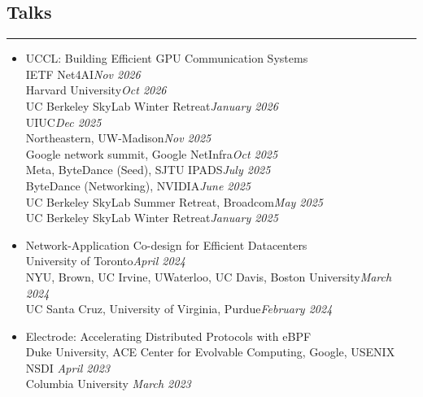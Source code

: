 \documentclass[letterpaper, 11pt]{article}
\newcommand\toRight{\hspace*{0pt}\hfill}
\newcounter{mySaveCounter}
\newcommand\myEnumReset{\setcounter{mySaveCounter}{0}}
\begin{document}
\myEnumReset 

\subsection*{\sc Talks}
\hrule
\vspace{0.2cm}

\begin{itemize}
    \setlength{\itemsep}{0pt}%
    \setlength{\parskip}{5pt}%
\item UCCL: Building Efficient GPU Communication Systems\\[-1.5pt]
    IETF Net4AI\toRight \textit{Nov 2026}\\[-1.5pt]
    Harvard University\toRight \textit{Oct 2026}\\[-1.5pt]
    UC Berkeley SkyLab Winter Retreat\toRight \textit{January 2026}\\[-1.5pt]
    UIUC\toRight \textit{Dec 2025}\\[-1.5pt]
    Northeastern, UW-Madison\toRight \textit{Nov 2025}\\[-1.5pt]
    Google network summit, Google NetInfra\toRight \textit{Oct 2025}\\[-1.5pt]
    Meta, ByteDance (Seed), SJTU IPADS\toRight \textit{July 2025}\\[-1.5pt]
    ByteDance (Networking), NVIDIA\toRight \textit{June 2025}\\[-1.5pt]
    UC Berkeley SkyLab Summer Retreat, Broadcom\toRight \textit{May 2025}\\[-1.5pt]
    UC Berkeley SkyLab Winter Retreat\toRight \textit{January 2025}

\item Network-Application Co-design for Efficient Datacenters\\
    University of Toronto\toRight \textit{April 2024}\\
    NYU, Brown, UC Irvine, UWaterloo, UC Davis, Boston University\toRight \textit{March 2024}\\
    UC Santa Cruz, University of Virginia, Purdue\toRight \textit{February 2024}

\item Electrode: Accelerating Distributed Protocols with eBPF\\
    Duke University, ACE Center for Evolvable Computing, Google, USENIX NSDI \toRight \textit{April 2023}\\
    Columbia University \toRight \textit{March 2023}


\end{itemize}
\end{document}
